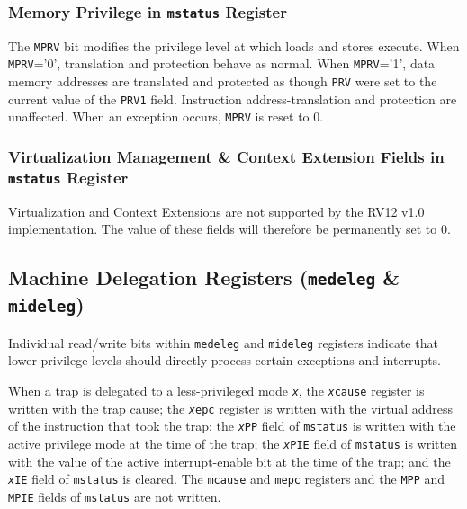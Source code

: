 \subsubsection{Memory Privilege in \texttt{mstatus} Register
}\label{memory-privilege-in-mstatus-register}

The \texttt{MPRV} bit modifies the privilege level at which loads and stores
execute. When \texttt{MPRV}='0', translation and protection behave as normal.
When \texttt{MPRV}='1', data memory addresses are translated and protected as
though \texttt{PRV} were set to the current value of the \texttt{PRV1} field. Instruction
address-translation and protection are unaffected. When an exception
occurs, \texttt{MPRV} is reset to 0.

\subsubsection{Virtualization Management \& Context Extension Fields in
\texttt{mstatus} Register
}\label{virtualization-management-context-extension-fields-in-mstatus-register}

Virtualization and Context Extensions are not supported by the RV12 v1.0
implementation. The value of these fields will therefore be permanently
set to 0.

\subsection{Machine Delegation Registers
(\texttt{medeleg} \& \texttt{mideleg})} \label{machine-exception-interrupt-delegation-registers-medeleg-mideleg}

Individual read/write bits within \texttt{medeleg} and \texttt{mideleg}
registers indicate that lower privilege levels should directly process certain
exceptions and interrupts.

When a trap is delegated to a less-privileged mode \texttt{\emph{x}}, the
\texttt{\emph{x}cause} register is written with the trap cause; the
\texttt{\emph{x}epc} register is written with the virtual address of the
instruction that took the trap; the \texttt{\emph{x}PP} field of
\texttt{mstatus} is written with the active privilege mode at the time of the
trap; the \texttt{\emph{x}PIE} field of \texttt{mstatus} is written with the
value of the active interrupt-enable bit at the time of the trap; and the
\texttt{\emph{x}IE} field of \texttt{mstatus} is cleared. The \texttt{mcause}
and \texttt{mepc} registers and the \texttt{MPP} and \texttt{MPIE} fields of
\texttt{mstatus} are not written.

